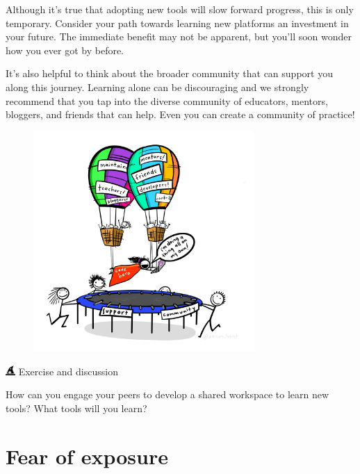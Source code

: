 \documentclass[
  letterpaper,
  DIV=11,
  numbers=noendperiod]{scrreprt}
\begin{document}
Although it's true that adopting new tools will slow forward progress,
this is only temporary. Consider your path towards learning new
platforms an investment in your future. The immediate benefit may not be
apparent, but you'll soon wonder how you ever got by before.

It's also helpful to think about the broader community that can support
you along this journey. Learning alone can be discouraging and we
strongly recommend that you tap into the diverse community of educators,
mentors, bloggers, and friends that can help. Even you can create a
community of practice!

\begin{figure}

{\centering \includegraphics[width=0.75\textwidth,height=\textheight]{./img/code_hero.jpg}

}

\end{figure}

\includegraphics[width=1em,height=1em]{./implement_files/figure-pdf/fa-icon-20d474448f872ee43905e611a2502347.pdf}
Exercise and discussion

How can you engage your peers to develop a shared workspace to learn new
tools? What tools will you learn?

\hypertarget{fear-of-exposure}{%
\section{Fear of exposure}\label{fear-of-exposure}}
\end{document}
